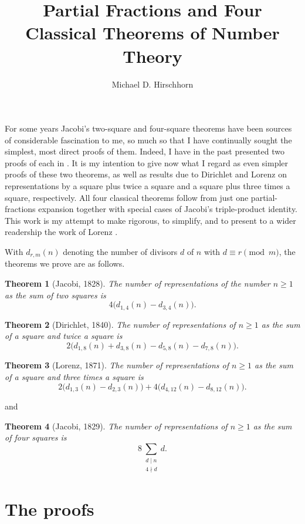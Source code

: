 \documentclass[10pt]{article}
\title{Partial Fractions and Four Classical Theorems of Number Theory}
\author{Michael D. Hirschhorn}
\date{}
\newtheorem*{theorem}{Theorem}
\begin{document}
\maketitle

For some years Jacobi's two-square and four-square theorems have been sources of
considerable fascination to me, so much so that I have continually sought the
simplest, most direct proofs of them. Indeed, I have in the past presented two
proofs of each in \cite{Hirschhorn1982,Hirschhorn1985,Hirschhorn1987,Hirschhorn1999}.
It is my intention to give now what I regard as even simpler proofs of these two
theorems, as well as results due to Dirichlet and Lorenz on representations by a
square plus twice a square and a square plus three times a square, respectively.
All four classical theorems follow from just one partial-fractions expansion
together with special cases of Jacobi's triple-product identity. This work is my
attempt to make rigorous, to simplify, and to present to a wider readership the
work of Lorenz \cite{Lorenz1871}.

With $d_{r,m}(n)$ denoting the number of divisors $d$ of $n$ with
$d\equiv r\pmod m$, the theorems we prove are as follows.

\begin{theorem}[Jacobi, 1828]
The number of representations of the number $n\geq 1$ as the sum of two squares is
\[
4\bigl(d_{1,4}(n)-d_{3,4}(n)\bigr).
\]
\end{theorem}

\begin{theorem}[Dirichlet, 1840]
The number of representations of $n\geq 1$ as the sum of a square and twice a
square is
\[
2\bigl(d_{1,8}(n)+d_{3,8}(n)-d_{5,8}(n)-d_{7,8}(n)\bigr).
\]
\end{theorem}

\begin{theorem}[Lorenz, 1871]
The number of representations of $n\geq 1$ as the sum of a square and three times
a square is
\[
2\bigl(d_{1,3}(n)-d_{2,3}(n)\bigr)
 +4\bigl(d_{4,12}(n)-d_{8,12}(n)\bigr).
\]
\end{theorem}

and

\begin{theorem}[Jacobi, 1829]
The number of representations of $n\geq 1$ as the sum of four squares is
\[
8\sum_{\substack{d\mid n\\4\nmid d}} d.
\]
\end{theorem}

\section*{The proofs}
\end{document}
